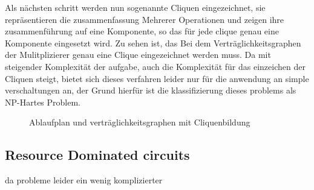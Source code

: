 \documentclass[conference]{IEEEtran}
\begin{document}
Als nächsten schritt werden nun sogenannte Cliquen eingezeichnet, sie repräsentieren die zusammenfassung Mehrerer Operationen und zeigen ihre zusammenführung auf eine Komponente, so das für jede clique genau eine Komponente eingesetzt wird. Zu sehen ist, das Bei dem Verträglichkeitsgraphen der Mulitplizierer genau eine Clique eingezeichnet werden muss. Da mit steigender Komplexität der aufgabe, auch die Komplexität für das einzeichen der Cliquen steigt, bietet sich dieses verfahren leider nur für die anwendung an simple verschaltungen an, der Grund hierfür ist die klassifizierung dieses problems als NP-Hartes Problem.\cite[S.361]{2}\\
\begin{figure}[h]
\caption{Ablaufplan und verträglichkeitsgraphen mit Cliquenbildung}
\label{fig.3}
\end{figure}






\subsection{Resource Dominated circuits}
da probleme leider ein wenig komplizierter 
\end{document}
